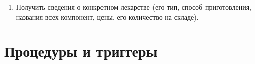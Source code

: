 \documentclass[a4paper]{article}
\begin{document}
\begin{enumerate}
				
				
			\item Получить сведения о конкретном лекарстве (его тип, способ приготовления, названия всех компонент, цены, его количество на складе).
				
				
		\end{enumerate}
		
	\newpage
	
	\section{Процедуры и триггеры}
\end{document}
